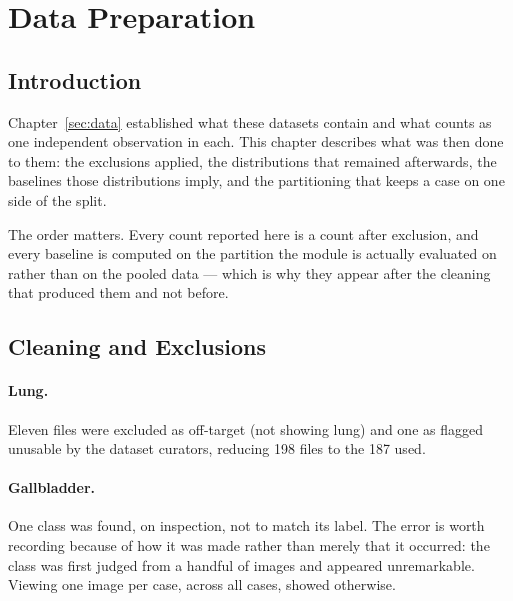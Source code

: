 %
\section{Data Preparation}
\label{sec:dataprep}

\subsection{Introduction}

Chapter~\ref{sec:data} established what these datasets contain and what counts as one
independent observation in each. This chapter describes what was then done to them: the
exclusions applied, the distributions that remained afterwards, the baselines those
distributions imply, and the partitioning that keeps a case on one side of the split.

The order matters. Every count reported here is a count after exclusion, and every baseline
is computed on the partition the module is actually evaluated on rather than on the pooled
data --- which is why they appear after the cleaning that produced them and not before.

\subsection{Cleaning and Exclusions}
\label{subsec:data-cleaning}

\paragraph{Lung.} Eleven files were excluded as off-target (not showing lung) and one as
flagged unusable by the dataset curators, reducing 198 files to the 187 used.

\paragraph{Gallbladder.} One class was found, on inspection, not to match its label. The
error is worth recording because of how it was made rather than merely that it occurred: the
class was first judged from a handful of images and appeared unremarkable. Viewing one image
per case, across all cases, showed otherwise.

